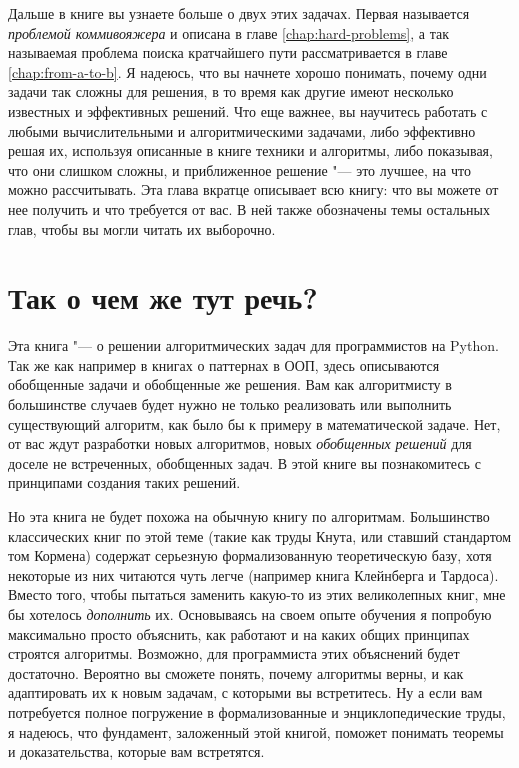 Дальше в книге вы узнаете больше о двух этих задачах. Первая называется \textit {проблемой коммивояжера} и описана в главе \ref{chap:hard-problems}, а так называемая проблема поиска кратчайшего пути рассматривается в главе \ref{chap:from-a-to-b}. Я надеюсь, что вы начнете хорошо понимать, почему одни задачи так сложны для решения, в то время как другие имеют несколько известных и эффективных решений. Что еще важнее, вы научитесь работать с любыми вычислительными и алгоритмическими задачами, либо эффективно решая их, используя описанные в книге техники и алгоритмы, либо показывая, что они слишком сложны, и приближенное решение "--- это лучшее, на что можно рассчитывать. Эта глава вкратце описывает всю книгу: что вы можете от нее получить и что требуется от вас. В ней также обозначены темы остальных глав, чтобы вы могли читать их выборочно.

\section{Так о чем же тут речь?}

Эта книга "--- о решении алгоритмических задач для программистов на Python. Так же как например в книгах о паттернах в ООП, здесь описываются обобщенные задачи и обобщенные же решения. Вам как алгоритмисту в большинстве случаев будет нужно не только реализовать или выполнить существующий алгоритм, как было бы к примеру в математической задаче. Нет, от вас ждут разработки новых алгоритмов, новых \textit{обобщенных решений} для доселе не встреченных, обобщенных задач. В этой книге вы познакомитесь с принципами создания таких решений.

Но эта книга не будет похожа на обычную книгу по алгоритмам. Большинство классических книг по этой теме (такие как труды Кнута, или ставший стандартом том Кормена) содержат серьезную формализованную теоретическую базу, хотя некоторые из них читаются чуть легче (например книга Клейнберга и Тардоса). Вместо того, чтобы пытаться заменить какую-то из этих великолепных книг, мне бы хотелось \textit{дополнить} их. Основываясь на своем опыте обучения я попробую максимально просто объяснить, как работают и на каких общих принципах строятся алгоритмы. Возможно, для программиста этих объяснений будет достаточно. Вероятно вы сможете понять, почему алгоритмы верны, и как адаптировать их к новым задачам, с которыми вы встретитесь. Ну а если вам потребуется полное погружение в формализованные и энциклопедические труды, я надеюсь, что фундамент, заложенный этой книгой, поможет понимать теоремы и доказательства, которые вам встретятся.

